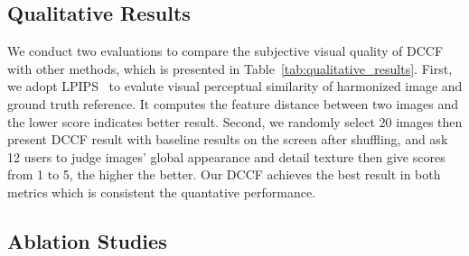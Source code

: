 \documentclass[runningheads]{llncs}
\begin{document}
    \subsection{Qualitative Results}

    We conduct two evaluations to compare the subjective visual quality of 
    DCCF with other methods, which is presented in Table~\ref{tab:qualitative_results}. First, we adopt LPIPS~\cite{zhang2018perceptual} to evalute visual perceptual similarity of harmonized image and ground truth reference. It computes the feature distance between two images and the lower score indicates better result. Second, we randomly select 20 images then present DCCF result with baseline results on the screen after shuffling, and ask 12 users to judge images' global appearance and detail texture then give scores from 1 to 5, the higher the better. Our DCCF achieves the best result in both metrics which is consistent the quantative performance.


    \begin{table}[!htb]
        \scriptsize
        \vspace{-15pt}
\centering
              \vspace{5pt}
              \caption{\textbf{Qualitative results}. We evaluate visual perceptual quality by DNN-based image quality accessment LPIPS~\cite{zhang2018perceptual} and a user study.}
              \label{tab:qualitative_results}
\vspace{-20pt}
        
    \end{table}



    \subsection{Ablation Studies}
\end{document}
